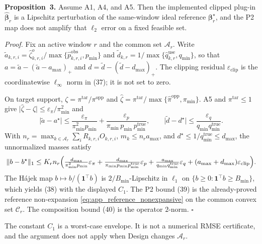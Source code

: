 \noindent\textbf{Proposition~3.}
Assume A1, A4, and A5.  Then the implemented clipped plug-in
$\widehat{\boldsymbol\beta}_r$ is a Lipschitz perturbation of the
same-window ideal reference $\boldsymbol\beta_r^\star$, and the P2 map
does not amplify that $\ell_2$ error on a fixed feasible set.

\noindent\emph{Proof.}
Fix an active window $r$ and the common set $\mathcal{A}_r$.
Write $\widetilde a_{k,r,i}=\widehat\zeta^{o}_{k,r,i}/
\max\{\widehat p^{\mathrm{obs}}_{k,r,i},p_{\min}\}$ and
$\widetilde d_{k,r}=1/\max\{\widehat q^{\mathrm{use}}_{k,r},q_{\min}\}$,
so that
$a=\widetilde a-(\widetilde a-a_{\max})_+$ and
$d=\widetilde d-(\widetilde d-d_{\max})_+$.
The clipping residual $\varepsilon_{\mathrm{clip}}$ is the
coordinatewise $\ell_{\infty}$ norm in (37); it is not set to zero.

On target support, $\zeta=\pi^{\mathrm{tar}}/\pi^{\mathrm{opp}}$ and
$\widehat\zeta=\pi^{\mathrm{tar}}/\max\{\widehat\pi^{\mathrm{opp}},
\pi_{\min}\}$.  A5 and $\pi^{\mathrm{tar}}\le1$ give
$\lvert\widehat\zeta-\zeta\rvert\le\varepsilon_\pi/\pi_{\min}^2$ and
\begin{equation}
 \bigl\lvert\widetilde a-a^\star\bigr\rvert
 \le
 \frac{\varepsilon_\pi}{\pi_{\min}^2 p_{\min}}
 +\frac{\varepsilon_p}{\pi_{\min}\,p_{\min}\,p_{\min}^{\mathrm{true}}},
 \qquad
 \bigl\lvert\widetilde d-d^\star\bigr\rvert
 \le
 \frac{\varepsilon_q}{q_{\min}q_{\min}^{\mathrm{true}}}.
 \label{eq:app_plugin_lipschitz}
\end{equation}
With $n_r=\max_{k\in\mathcal{A}_r}\sum_i R_{k,r,i}O_{k,r,i}$,
$m_k\le n_r a_{\max}$, and
$d^\star\le 1/q_{\min}^{\mathrm{true}}\le d_{\max}$,
the unnormalized masses satisfy
\begin{equation}
 \|b-b^\star\|_1
 \le
 K_r n_r
 \Bigl(
 \tfrac{d_{\max}}{\pi_{\min}^2 p_{\min}}\varepsilon_\pi
 +\tfrac{d_{\max}}{\pi_{\min}p_{\min}p_{\min}^{\mathrm{true}}}\varepsilon_p
 +\tfrac{a_{\max}}{q_{\min}q_{\min}^{\mathrm{true}}}\varepsilon_q
 +(a_{\max}+d_{\max})\varepsilon_{\mathrm{clip}}
 \Bigr).
 \label{eq:app_plugin_mass}
\end{equation}
The H\'ajek map $b\mapsto b/(\mathbf{1}^{\top}b)$ is
$2/B_{\min}$-Lipschitz in $\ell_1$ on
$\{b\ge0:\mathbf{1}^{\top}b\ge B_{\min}\}$, which yields
(38) with the displayed $C_1$.
The P2 bound (39) is the already-proved reference
non-expansion \eqref{eq:app_reference_nonexpansive} on the common
convex set $\mathcal{C}_r$.  The composition bound
(40) is the operator $2$-norm.
\hfill$\square$

The constant $C_1$ is a worst-case envelope.  It is not a numerical
RMSE certificate, and the argument does not apply when Design changes
$\mathcal{A}_r$.



